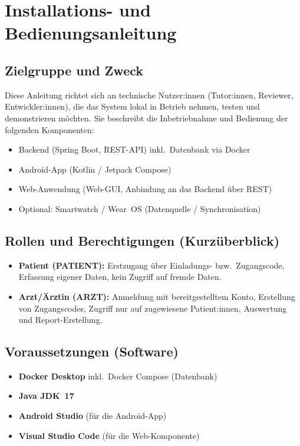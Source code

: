 \section{Installations- und Bedienungsanleitung}
\subsection{Zielgruppe und Zweck}

Diese Anleitung richtet sich an technische Nutzer:innen (Tutor:innen, Reviewer, Entwickler:innen),
die das System lokal in Betrieb nehmen, testen und demonstrieren möchten.
Sie beschreibt die Inbetriebnahme und Bedienung der folgenden Komponenten:

\begin{itemize}
  \item Backend (Spring Boot, REST-API) inkl.\ Datenbank via Docker
  \item Android-App (Kotlin / Jetpack Compose)
  \item Web-Anwendung (Web-GUI, Anbindung an das Backend über REST)
  \item Optional: Smartwatch / Wear~OS (Datenquelle / Synchronisation)
\end{itemize}


\subsection{Rollen und Berechtigungen (Kurzüberblick)}

\begin{itemize}
  \item \textbf{Patient (PATIENT):} Erstzugang über Einladungs- bzw.\ Zugangscode,
        Erfassung eigener Daten, kein Zugriff auf fremde Daten.
  \item \textbf{Arzt/Ärztin (ARZT):} Anmeldung mit bereitgestelltem Konto,
        Erstellung von Zugangscodes, Zugriff nur auf zugewiesene Patient:innen,
        Auswertung und Report-Erstellung.
\end{itemize}


\subsection{Voraussetzungen (Software)}

\begin{itemize}
  \item \textbf{Docker Desktop} inkl.\ Docker Compose (Datenbank)
  \item \textbf{Java JDK~17}
  \item \textbf{Android Studio} (für die Android-App)
  \item \textbf{Visual Studio Code} (für die Web-Komponente)
\end{itemize}

